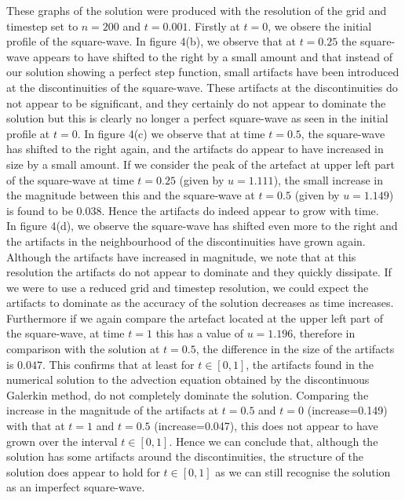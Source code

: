 \documentclass[a4paper, 12pt]{article}
\begin{document}
These graphs of the solution were produced with the resolution of the grid and timestep set to $n=200$ and $t=0.001$. Firstly at $t=0$, we obsere the initial profile of the square-wave. In figure 4(b), we observe that at $t=0.25$ the square-wave appears to have shifted to the right by a small amount and that instead of our solution showing a perfect step function, small artifacts have been introduced at the discontinuities of the square-wave. These artifacts at the discontinuities do not appear to be significant, and they certainly do not appear to dominate the solution but this is clearly no longer a perfect square-wave as seen in the initial profile at $t=0$. In figure 4(c) we observe that at time $t=0.5$, the square-wave has shifted to the right again, and the artifacts do appear to have increased in size by a small amount. If we consider the peak of the artefact at upper left part of the square-wave at time $t=0.25$ (given by $u=1.111$), the small increase in the magnitude between this and the square-wave at $t=0.5$ (given by $u=1.149$) is found to be $0.038$. Hence the artifacts do indeed appear to grow with time. \\     

In figure 4(d), we observe the square-wave has shifted even more to the right and the artifacts in the neighbourhood of the discontinuities have grown again. Although the artifacts have increased in magnitude, we note that at this resolution the artifacts do not appear to dominate and they quickly dissipate. If we were to use a reduced grid and timestep resolution, we could expect the artifacts to dominate as the accuracy of the solution decreases as time increases. Furthermore if we again compare the artefact located at the upper left part of the square-wave, at time $t=1$ this has a value of $u=1.196$, therefore in comparison with the solution at $t=0.5$, the difference in the size of the artifacts is $0.047$. This confirms that at least for $t\in[0,1]$, the artifacts found in the numerical solution to the advection equation obtained by the discontinuous Galerkin method, do not completely dominate the solution. Comparing the increase in the magnitude of the artifacts at $t=0.5$ and $t=0$ (increase=0.149) with that at $t=1$ and $t=0.5$ (increase=0.047), this does not appear to have grown over the interval $t\in[0,1]$. Hence we can conclude that, although the solution has some artifacts around the discontinuities, the structure of the solution does appear to hold for $t\in[0,1]$ as we can still recognise the solution as an imperfect square-wave. \\
\end{document}

